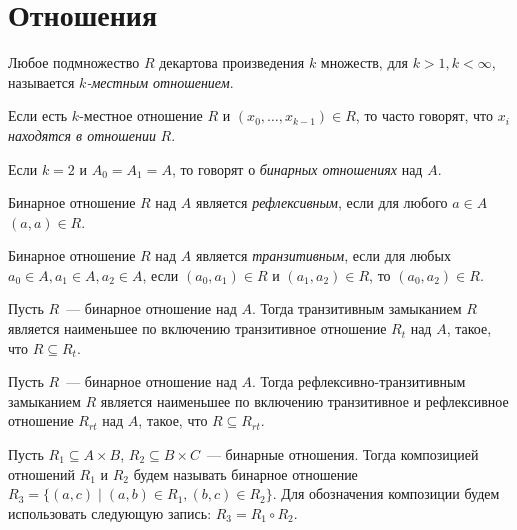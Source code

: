 \section{Отношения}
\label{sec:Relations}

\begin{definition}[Отношение]
    Любое подмножество $R$ декартова произведения $k$ множеств, для $k > 1, k < \infty$, называется \emph{$k$-местным отношением}.
\end{definition}

Если есть $k$-местное отношение $R$ и $(x_0,\ldots, x_{k-1}) \in R$, то часто говорят, что $x_i$ \emph{находятся в отношении} $R$.

Если $k=2$ и $A_0 = A_1 = A$, то говорят о \emph{бинарных отношениях} над $A$.

\begin{definition}
    Бинарное отношение $R$ над $A$ является \emph{рефлексивным}, если для любого $a \in A$ $(a,a) \in R$.
\end{definition}


\begin{definition}
    Бинарное отношение $R$ над $A$ является \emph{транзитивным}, если для любых $a_0 \in A, a_1 \in A, a_2 \in A$, если $(a_0,a_1) \in R$ и  $(a_1,a_2) \in R$, то $(a_0,a_2) \in R$.
\end{definition}

\begin{definition}
    Пусть $R$~--- бинарное отношение над $A$.
    Тогда транзитивным замыканием $R$ является наименьшее по включению транзитивное отношение $R_t$ над $A$, такое, что $R \subseteq R_t$.
\end{definition}

\begin{definition}
    Пусть $R$~--- бинарное отношение над $A$.
    Тогда рефлексивно-транзитивным замыканием $R$ является наименьшее по включению транзитивное и рефлексивное отношение $R_{rt}$ над $A$, такое, что $R \subseteq R_{rt}$.
\end{definition}

\begin{definition}
    Пусть $R_1 \subseteq A \times B$, $R_2 \subseteq B \times C$~--- бинарные отношения.
    Тогда композицией отношений $R_1$ и $R_2$ будем называть бинарное отношение $R_3 = \{ (a,c) \mid (a,b) \in R_1 , (b,c) \in R_2\}$.
    Для обозначения композиции будем использовать следующую запись: $R_3 = R_1 \circ R_2$.
\end{definition}


